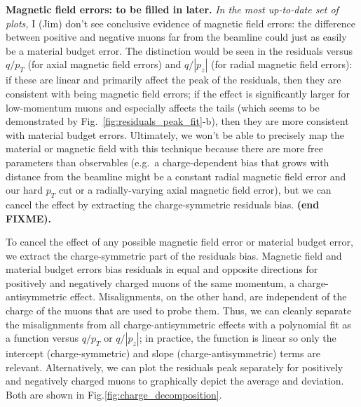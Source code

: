 \documentclass[12pt]{article}
\begin{document}
{\bf Magnetic field errors: to be filled in later.}  {\it In the most
  up-to-date set of plots,} I (Jim) don't see conclusive evidence of
magnetic field errors: the difference between positive and negative
muons far from the beamline could just as easily be a material budget
error.  The distinction would be seen in the residuals versus $q/p_T$
(for axial magnetic field errors) and $q/|p_z|$ (for radial magnetic
field errors): if these are linear and primarily affect the peak of
the residuals, then they are consistent with being magnetic field
errors; if the effect is significantly larger for low-momentum muons
and especially affects the tails (which seems to be demonstrated by
Fig.~\ref{fig:residuals_peak_fit}-b), then they are more consistent
with material budget errors.  Ultimately, we won't be able to
precisely map the material or magnetic field with this technique
because there are more free parameters than observables (e.g.\ a
charge-dependent bias that grows with distance from the beamline might
be a constant radial magnetic field error and our hard $p_T$ cut or a
radially-varying axial magnetic field error), but we can cancel the
effect by extracting the charge-symmetric residuals bias. {\bf (end
  FIXME).}

To cancel the effect of any possible magnetic field error or material
budget error, we extract the charge-symmetric part of the residuals
bias.  Magnetic field and material budget errors bias residuals in
equal and opposite directions for positively and negatively charged
muons of the same momentum, a charge-antisymmetric effect.
Misalignments, on the other hand, are independent of the charge of the
muons that are used to probe them.  Thus, we can cleanly separate
the misalignments from all charge-antisymmetric effects with a
polynomial fit as a function versus $q/p_T$ or $q/|p_z|$; in practice,
the function is linear so only the intercept (charge-symmetric) and
slope (charge-antisymmetric) terms are relevant.  Alternatively, we
can plot the residuals peak separately for positively and negatively
charged muons to graphically depict the average and deviation.  Both
are shown in Fig.\ref{fig:charge_decomposition}.
\end{document}
